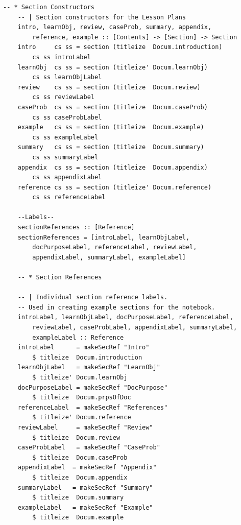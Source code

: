 \begin{lstlisting}[language=haskell1, 
	basicstyle=\linespread{1.1}\small\ttfamily]	
	-- * Section Constructors	
	-- | Section constructors for the Lesson Plans
	intro, learnObj, review, caseProb, summary, appendix, 
		reference, example :: [Contents] -> [Section] -> Section
	intro     cs ss = section (titleize  Docum.introduction) 
		cs ss introLabel
	learnObj  cs ss = section (titleize' Docum.learnObj)    
		cs ss learnObjLabel
	review    cs ss = section (titleize  Docum.review)      
		cs ss reviewLabel
	caseProb  cs ss = section (titleize  Docum.caseProb)     
		cs ss caseProbLabel
	example   cs ss = section (titleize  Docum.example)      
		cs ss exampleLabel
	summary   cs ss = section (titleize  Docum.summary)      
		cs ss summaryLabel
	appendix  cs ss = section (titleize  Docum.appendix)     
		cs ss appendixLabel
	reference cs ss = section (titleize' Docum.reference)   
		cs ss referenceLabel
	
	--Labels--
	sectionReferences :: [Reference]
	sectionReferences = [introLabel, learnObjLabel, 
		docPurposeLabel, referenceLabel, reviewLabel, 
		appendixLabel, summaryLabel, exampleLabel]
	
	-- * Section References
	
	-- | Individual section reference labels. 
	-- Used in creating example sections for the notebook.
	introLabel, learnObjLabel, docPurposeLabel, referenceLabel, 
		reviewLabel, caseProbLabel, appendixLabel, summaryLabel, 
		exampleLabel :: Reference
	introLabel      = makeSecRef "Intro"            
		$ titleize  Docum.introduction
	learnObjLabel   = makeSecRef "LearnObj"         
		$ titleize' Docum.learnObj
	docPurposeLabel = makeSecRef "DocPurpose"       
		$ titleize  Docum.prpsOfDoc
	referenceLabel  = makeSecRef "References"       
		$ titleize'	Docum.reference
	reviewLabel     = makeSecRef "Review"           
		$ titleize  Docum.review
	caseProbLabel   = makeSecRef "CaseProb"         
		$ titleize  Docum.caseProb
	appendixLabel  = makeSecRef "Appendix"         
		$ titleize  Docum.appendix
	summaryLabel   = makeSecRef "Summary"          
		$ titleize  Docum.summary
	exampleLabel   = makeSecRef "Example"         
		$ titleize  Docum.example
\end{lstlisting}

\newpage

